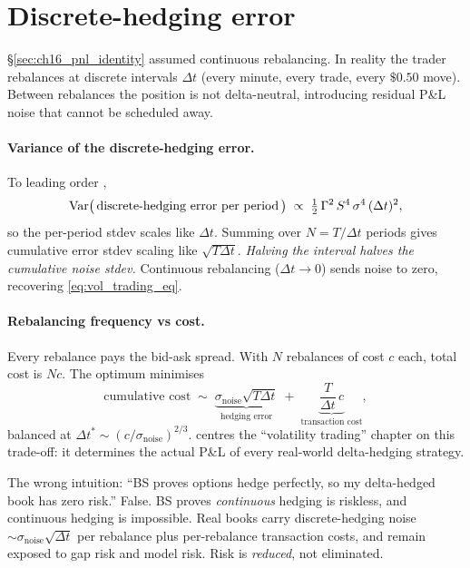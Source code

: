 \section{Discrete-hedging error}
\label{sec:ch16_discrete_hedging}

\S\ref{sec:ch16_pnl_identity} assumed continuous rebalancing. In
reality the trader rebalances at discrete intervals $\Delta t$
(every minute, every trade, every $\$0.50$ move). Between
rebalances the position is not delta-neutral, introducing residual
P\&L noise that cannot be scheduled away.

\paragraph{Variance of the discrete-hedging error.}
To leading order \citeSinclair,
\begin{equation}
  \operatorname{Var}\bigl(\,\text{discrete-hedging error per period}\,\bigr)
  \;\propto\; \tfrac12\,\Gamma^2\,S^4\,\sigma^4\,(\Delta t)^2,
  \label{eq:disc_hedge_var}
\end{equation}
so the per-period stdev scales like $\Delta t$. Summing over $N =
T/\Delta t$ periods gives cumulative error stdev scaling like
$\sqrt{T \Delta t}$. \emph{Halving the interval halves the
cumulative noise stdev.} Continuous rebalancing ($\Delta t \to 0$)
sends noise to zero, recovering \eqref{eq:vol_trading_eq}.

\paragraph{Rebalancing frequency vs cost.}
Every rebalance pays the bid-ask spread. With $N$ rebalances of
cost $c$ each, total cost is $Nc$. The optimum minimises
\begin{equation*}
  \text{cumulative cost} \;\sim\; \underbrace{\sigma_{\text{noise}}\sqrt{T \Delta t}}_{\text{hedging error}}
                              \;+\; \underbrace{\frac{T}{\Delta t}\,c}_{\text{transaction cost}},
\end{equation*}
balanced at $\Delta t^* \sim (c/\sigma_{\text{noise}})^{2/3}$.
\citeSinclair centres the ``volatility trading'' chapter on this
trade-off: it determines the actual P\&L of every real-world
delta-hedging strategy.

\begin{pitfallbox}
The wrong intuition: ``BS proves options hedge perfectly, so my
delta-hedged book has zero risk.'' False. BS proves \emph{continuous}
hedging is riskless, and continuous hedging is impossible. Real
books carry discrete-hedging noise $\sim \sigma_{\text{noise}}
\sqrt{\Delta t}$ per rebalance plus per-rebalance transaction
costs, and remain exposed to gap risk and model risk. Risk is
\emph{reduced}, not eliminated.
\end{pitfallbox}

